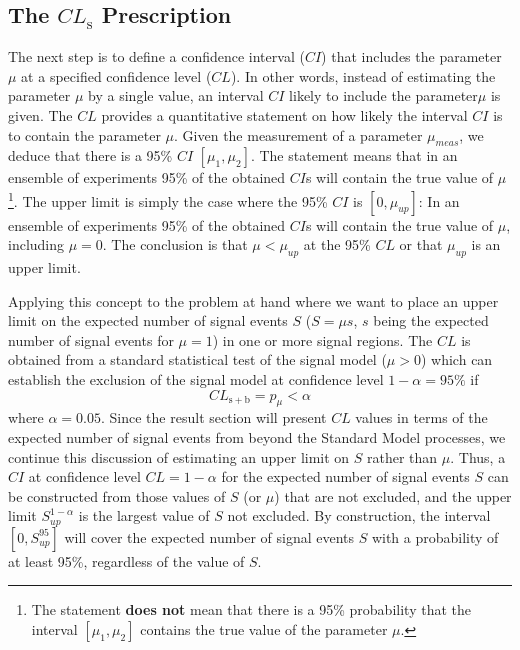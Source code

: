 \subsection{The $CL_\mathrm{s}$ Prescription}
The next step is to define a confidence interval ($CI$) that includes the parameter $\mu$ at a specified confidence level ($CL$). 
In other words, instead of estimating the parameter $\mu$ by a single value, an interval $CI$ likely to include the parameter$\mu$ is given.
The $CL$ provides a quantitative statement on how likely the interval $CI$ is to contain the parameter $\mu$. 
Given the measurement of a parameter $\mu_{meas}$, we deduce that there is
a 95\% $CI$ $[\mu_1,\mu_2]$. The statement means
that in an ensemble of experiments 95\% of the obtained $CI$s will contain 
the true value of $\mu$\footnote{The statement \textbf{does not} mean that
there is a 95\% probability that the interval $[\mu_1,\mu_2]$ contains the 
true value of the parameter $\mu$.}.
The upper limit is simply the case where the 95\% $CI$ is $[0,\mu_{up}]$:
In an ensemble of experiments 95\% of the obtained $CI$s will contain the true value of $\mu$, including $\mu=0$. 
The conclusion is that $\mu < \mu_{up}$ at the 95\% $CL$ or that $ \mu_{up}$ is an upper limit. 

Applying this concept to the problem at hand where we want to place an upper limit on the expected number of 
signal events $S$ ($S=\mu s$, $s$ being the expected number of signal events for $\mu=1$) in one or more signal regions.
The $CL$ is obtained from a standard statistical test of the signal model ($\mu>0$) which can establish the exclusion of the signal 
model at confidence level $1-\alpha = 95 \%$ if 
\begin{equation}
  CL_\mathrm{s+b}  = p_{\mu} < \alpha
\end{equation}
where $\alpha=0.05$. 
Since the result section will present $CL$ values in terms of the expected number of signal events from beyond the Standard Model 
processes, we continue this discussion of estimating an upper limit on $S$ rather than $\mu$.
Thus, a $CI$ at confidence level $CL=1-\alpha$ for the expected number of signal events $S$ can be constructed from those values of
$S$ (or $\mu$) that are not excluded, and the upper limit $S_{up}^{1-\alpha}$ is the largest value of $S$ not excluded.
By construction, the interval $[0,S_{up}^{95}]$ will cover the expected number of signal events $S$ with a probability of at least 
95\%, regardless of the value of $S$.

